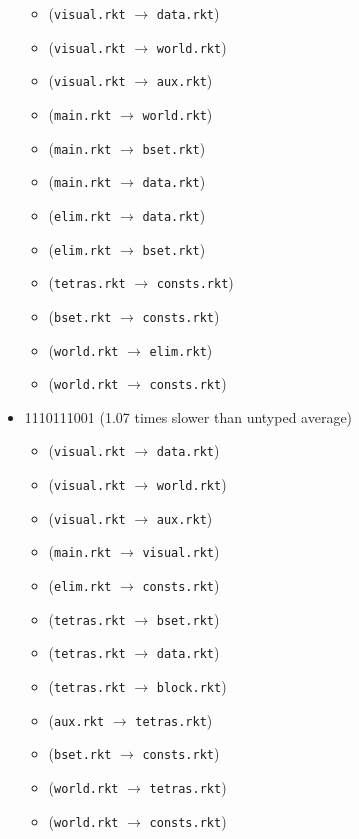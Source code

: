 \documentclass{article}
\newcommand{\mono}[1]{\texttt{#1}}
\begin{document}
\begin{itemize}
\begin{itemize}
  \item (\mono{visual.rkt} $\rightarrow$ \mono{data.rkt})
  \item (\mono{visual.rkt} $\rightarrow$ \mono{world.rkt})
  \item (\mono{visual.rkt} $\rightarrow$ \mono{aux.rkt})
  \item (\mono{main.rkt} $\rightarrow$ \mono{world.rkt})
  \item (\mono{main.rkt} $\rightarrow$ \mono{bset.rkt})
  \item (\mono{main.rkt} $\rightarrow$ \mono{data.rkt})
  \item (\mono{elim.rkt} $\rightarrow$ \mono{data.rkt})
  \item (\mono{elim.rkt} $\rightarrow$ \mono{bset.rkt})
  \item (\mono{tetras.rkt} $\rightarrow$ \mono{consts.rkt})
  \item (\mono{bset.rkt} $\rightarrow$ \mono{consts.rkt})
  \item (\mono{world.rkt} $\rightarrow$ \mono{elim.rkt})
  \item (\mono{world.rkt} $\rightarrow$ \mono{consts.rkt})
  \end{itemize}
\item 1110111001 (1.07 times slower than untyped average)
  \begin{itemize}
  \item (\mono{visual.rkt} $\rightarrow$ \mono{data.rkt})
  \item (\mono{visual.rkt} $\rightarrow$ \mono{world.rkt})
  \item (\mono{visual.rkt} $\rightarrow$ \mono{aux.rkt})
  \item (\mono{main.rkt} $\rightarrow$ \mono{visual.rkt})
  \item (\mono{elim.rkt} $\rightarrow$ \mono{consts.rkt})
  \item (\mono{tetras.rkt} $\rightarrow$ \mono{bset.rkt})
  \item (\mono{tetras.rkt} $\rightarrow$ \mono{data.rkt})
  \item (\mono{tetras.rkt} $\rightarrow$ \mono{block.rkt})
  \item (\mono{aux.rkt} $\rightarrow$ \mono{tetras.rkt})
  \item (\mono{bset.rkt} $\rightarrow$ \mono{consts.rkt})
  \item (\mono{world.rkt} $\rightarrow$ \mono{tetras.rkt})
  \item (\mono{world.rkt} $\rightarrow$ \mono{consts.rkt})
  \end{itemize}

\end{itemize}
\end{document}
